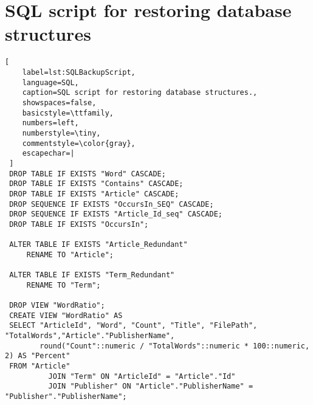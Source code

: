 \chapter{SQL script for restoring database structures}\label{SQLBackupScript}
\begin{lstlisting}[
    label=lst:SQLBackupScript,
    language=SQL,
    caption=SQL script for restoring database structures.,
    showspaces=false,
    basicstyle=\ttfamily,
    numbers=left,
    numberstyle=\tiny,
    commentstyle=\color{gray},
    escapechar=|
 ]
 DROP TABLE IF EXISTS "Word" CASCADE;
 DROP TABLE IF EXISTS "Contains" CASCADE;
 DROP TABLE IF EXISTS "Article" CASCADE;
 DROP SEQUENCE IF EXISTS "OccursIn_SEQ" CASCADE;
 DROP SEQUENCE IF EXISTS "Article_Id_seq" CASCADE;
 DROP TABLE IF EXISTS "OccursIn";
 
 ALTER TABLE IF EXISTS "Article_Redundant"
     RENAME TO "Article";
 
 ALTER TABLE IF EXISTS "Term_Redundant"
     RENAME TO "Term";
 
 DROP VIEW "WordRatio";
 CREATE VIEW "WordRatio" AS
 SELECT "ArticleId", "Word", "Count", "Title", "FilePath", "TotalWords","Article"."PublisherName",
        round("Count"::numeric / "TotalWords"::numeric * 100::numeric, 2) AS "Percent"
 FROM "Article"
          JOIN "Term" ON "ArticleId" = "Article"."Id"
          JOIN "Publisher" ON "Article"."PublisherName" = "Publisher"."PublisherName";
\end{lstlisting}